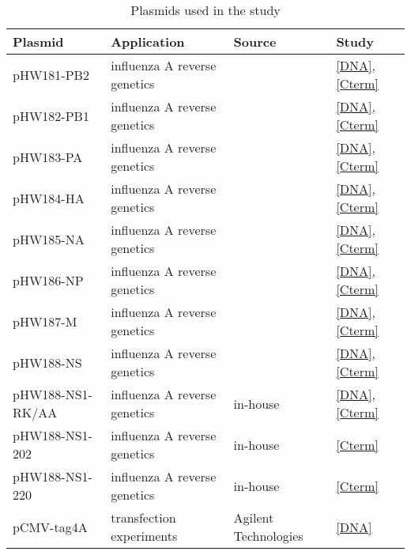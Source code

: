 		\begin{longtabu} to \linewidth {X[2,l] X[2,l] X[1.5,c] X[1,c]} 
		\caption{Plasmids used in the study} \label{tab:plasmids} \\
		
		\hline \textbf{Plasmid} & \textbf{Application} & \textbf{Source} & \textbf{Study} \\ 
		\endhead
		
		\hline pHW181-PB2 &  influenza A reverse genetics & \parencite{Hoffmann2000} &\ref*{DNA}, \ref{Cterm}  \\ 
		
		\hline pHW182-PB1 &  influenza A reverse genetics & \parencite{Hoffmann2000} &\ref*{DNA}, \ref{Cterm}  \\
		
		\hline pHW183-PA & influenza A reverse genetics & \parencite{Hoffmann2000} &\ref*{DNA}, \ref{Cterm}  \\
		
		\hline pHW184-HA &  influenza A reverse genetics & \parencite{Hoffmann2000} &\ref*{DNA}, \ref{Cterm}  \\
		
		\hline pHW185-NA &  influenza A reverse genetics & \parencite{Hoffmann2000} &\ref*{DNA}, \ref{Cterm}  \\
		
		\hline pHW186-NP &  influenza A reverse genetics & \parencite{Hoffmann2000} &\ref*{DNA}, \ref{Cterm}  \\
		
		\hline pHW187-M &  influenza A reverse genetics & \parencite{Hoffmann2000} &\ref*{DNA}, \ref{Cterm}  \\
		
		\hline pHW188-NS &  influenza A reverse genetics & \parencite{Hoffmann2000} &\ref*{DNA}, \ref{Cterm}  \\
		
		\hline pHW188-NS1-RK/AA &  influenza A reverse genetics & in-house &\ref*{DNA}, \ref{Cterm} \\
		
		\hline pHW188-NS1-202 & influenza A reverse genetics & in-house &\ref*{Cterm} \\
		
		\hline pHW188-NS1-220 &  influenza A reverse genetics & in-house &\ref*{Cterm} \\
		
		\hline pCMV-tag4A & transfection experiments & Agilent Technologies &\ref*{DNA} \\ 
		

\end{longtabu}
